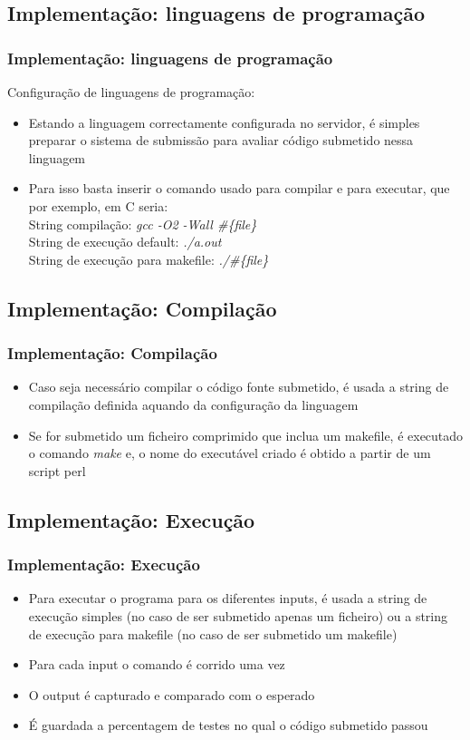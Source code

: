 \documentclass{beamer}
\begin{document}
\subsection{Implementação: linguagens de programação}
\begin{frame} \frametitle{Implementação: linguagens de programação}
Configuração de linguagens de programação:
\begin{itemize}
\item Estando a linguagem correctamente configurada no servidor, é 
simples preparar o sistema de submissão para avaliar código submetido nessa linguagem
\item Para isso basta inserir o comando usado para compilar e para executar, que por exemplo, em C seria:\\
String compilação: \textit{gcc -O2 -Wall \#\{file\}}\\
String de execução default: \textit{./a.out}\\
String de execução para makefile: \textit{./\#\{file\}}
\end{itemize}
\end{frame}

\subsection{Implementação: Compilação}
\begin{frame} \frametitle{Implementação: Compilação}
\begin{itemize}
\item Caso seja necessário compilar o código fonte submetido, é usada a string de compilação definida
aquando da configuração da linguagem
\item Se for submetido um ficheiro comprimido que inclua um makefile, é executado o comando \textit{make} e, 
o nome do executável criado é obtido a partir de um script perl
\end{itemize}
\end{frame}

\subsection{Implementação: Execução}
\begin{frame} \frametitle{Implementação: Execução}
\begin{itemize}
\item Para executar o programa para os diferentes inputs, é usada a string de execução simples (no caso de ser submetido
apenas um ficheiro) ou a string de execução para makefile (no caso de ser submetido um makefile)
\item Para cada input o comando é corrido uma vez
\item O output é capturado e comparado com o esperado
\item É guardada a percentagem de testes no qual o código submetido passou
\end{itemize}
\end{frame}
\end{document}
